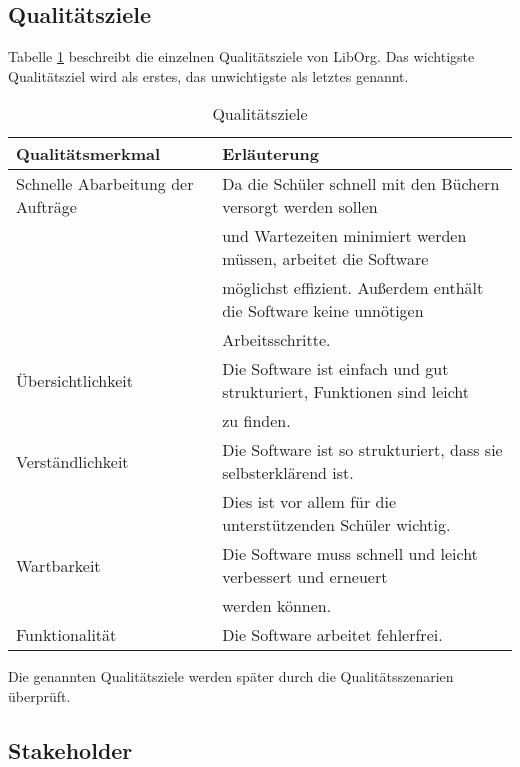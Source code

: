 \subsection{Qualitätsziele}
Tabelle \ref{tab:Qualitätsziele} beschreibt die einzelnen Qualitätsziele von LibOrg. Das wichtigste Qualitätsziel wird als erstes, das unwichtigste als letztes genannt.
\begin{table}[H]
	\centering
	\caption{Qualitätsziele}
	\label{tab:Qualitätsziele}
		\begin{tabular}{|l|l|}
			\hline
		Qualitätsmerkmal & Erläuterung \\ \hline
		Schnelle Abarbeitung der Aufträge & Da die Schüler schnell mit den Büchern versorgt werden sollen \\
		& und Wartezeiten minimiert werden müssen, arbeitet die Software \\
		& möglichst effizient. Außerdem enthält die Software keine unnötigen \\
		& Arbeitsschritte. \\ \hline
		Übersichtlichkeit & Die Software ist einfach und gut strukturiert, Funktionen sind leicht \\
		& zu finden. \\ \hline
		Verständlichkeit & Die Software ist so strukturiert, dass sie selbsterklärend ist.\\
		& Dies ist vor allem für die unterstützenden Schüler wichtig. \\ \hline
		Wartbarkeit & Die Software muss schnell und leicht verbessert und erneuert \\
		& werden können. \\ \hline
		Funktionalität & Die Software arbeitet fehlerfrei. \\ \hline
		\end{tabular}
\end{table}
Die genannten Qualitätsziele werden später durch die Qualitätsszenarien überprüft.

\subsection{Stakeholder}
